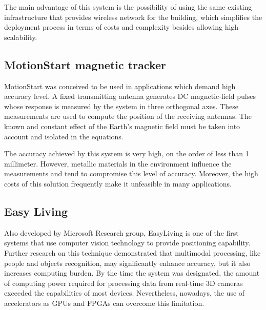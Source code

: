 The main advantage of this system is the possibility of using the same existing infrastructure that provides wireless network for the building, which simplifies the deployment process in terms of costs and complexity besides allowing high scalability.

\subsection{MotionStart magnetic tracker}
MotionStart was conceived to be used in applications which demand high accuracy level. A fixed transmitting antenna generates DC magnetic-field pulses whose response is measured by the system in three orthogonal axes. These measurements are used to compute the position of the receiving antennas. The known and constant effect of the Earth's magnetic field must be taken into account and isolated in the equations.

The accuracy achieved by this system is very high, on the order of less than 1 millimeter. However, metallic materials in the environment influence the measurements and tend to compromise this level of accuracy. Moreover, the high costs of this solution frequently make it unfeasible in many applications.

\subsection{Easy Living}
Also developed by Microsoft Research group, EasyLiving is one of the first systems that use computer vision technology to provide positioning capability. Further research on this technique %
demonstrated that multimodal processing, like people and objects recognition, may significantly enhance accuracy, but it also increases computing burden. By the time the system was designated, the amount of computing power required for processing data from real-time 3D cameras exceeded the capabilities of most devices. Nevertheless, nowadays, the use of accelerators as GPUs and FPGAs can overcome this limitation.